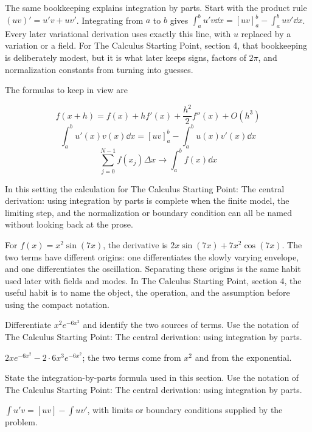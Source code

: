 The same bookkeeping explains integration by parts.  Start with the product rule \((uv)'=u'v+uv'\).  Integrating from \(a\) to \(b\) gives \(\int_a^b u'v\dd x=[uv]_a^b-\int_a^buv'\dd x\).  Every later variational derivation uses exactly this line, with \(u\) replaced by a variation or a field.  For The Calculus Starting Point, section 4, that bookkeeping is deliberately modest, but it is what later keeps signs, factors of \(2\pi\), and normalization constants from turning into guesses.

The formulas to keep in view are

\[
  f(x+h)=f(x)+hf'(x)+\frac{h^2}{2}f''(x)+O(h^3)
\]
\[
  \int_a^b u'(x)v(x)\dd x=[uv]_a^b-\int_a^b u(x)v'(x)\dd x
\]
\[
  \sum_{j=0}^{N-1}f(x_j)\Delta x\longrightarrow \int_a^b f(x)\dd x
\]

In this setting the calculation for The Calculus Starting Point: The central derivation: using integration by parts is complete when the finite model, the limiting step, and the normalization or boundary condition can all be named without looking back at the prose.




\begin{example}
For \(f(x)=x^2\sin(7x)\), the derivative is \(2x\sin(7x)+7x^2\cos(7x)\).  The two terms have different origins: one differentiates the slowly varying envelope, and one differentiates the oscillation.  Separating these origins is the same habit used later with fields and modes.  In The Calculus Starting Point, section 4, the useful habit is to name the object, the operation, and the assumption before using the compact notation.
\end{example}



\begin{exercise}
Differentiate \(x^2e^{-6x^2}\) and identify the two sources of terms.  Use the notation of The Calculus Starting Point: The central derivation: using integration by parts.
\begin{answer}
\(2xe^{-6x^2}-2\cdot 6x^3e^{-6x^2}\); the two terms come from \(x^2\) and from the exponential.
\end{answer}
\end{exercise}

\begin{exercise}
State the integration-by-parts formula used in this section.  Use the notation of The Calculus Starting Point: The central derivation: using integration by parts.
\begin{answer}
\(\int u'v=[uv]-\int uv'\), with limits or boundary conditions supplied by the problem.
\end{answer}
\end{exercise}



